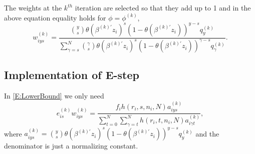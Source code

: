 \documentclass[reqno]{amsart}
\begin{document}
The weights at the $k^{th}$ iteration are selected so that they add up to 1 and in the above equation equality holds for $\phi=\phi^{(k)}$,
\begin{equation}\label{D:weights}
	w_{iys}^{(k)} = \frac{\binom{y}{s} {\theta(\beta^{(k)'}z_i)^s} {(1-\theta(\beta^{(k)'}z_i))}^{y-s} {q^{(k)}_y} }%
                          {\sum_{\gamma=s}^N \binom{\gamma}{s} {\theta(\beta^{(k)'}z_i)^s} {(1-\theta(\beta^{(k)'}z_i))}^{\gamma-s} {q^{(k)}_\gamma}}.
\end{equation}

\subsection{Implementation of E-step}

In \eqref{E:LowerBound} we only need
$$e_{is}^{(k)}w_{iys}^{(k)} = \frac{ f_i h(r_i, s, n_i, N) a_{iys}^{(k)}}{\sum_{t=0}^{N}\sum_{\gamma=t}^{N} h(r_i, t, n_i, N) a_{i\gamma t}^{(k)}},$$
where $a_{iys}^{(k)} = \binom{y}{s} {\theta(\beta^{(k)'}z_i)^s} {(1-\theta(\beta^{(k)'}z_i))}^{y-s} {q^{(k)}_y}$ and the denominator is just a normalizing constant.
\end{document}
